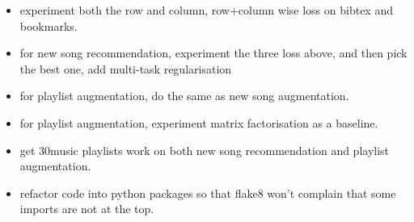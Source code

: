 \TODO

\begin{itemize}
\item experiment both the row and column, row+column  wise loss on bibtex and bookmarks.
\item for new song recommendation, experiment the three loss above, and then pick the best one, add multi-task regularisation
\item for playlist augmentation, do the same as new song augmentation.
\item for playlist augmentation, experiment matrix factorisation as a baseline.
\item get 30music playlists work on both new song recommendation and playlist augmentation.
\item refactor code into python packages so that flake8 won't complain that some imports are not at the top.
\end{itemize}
